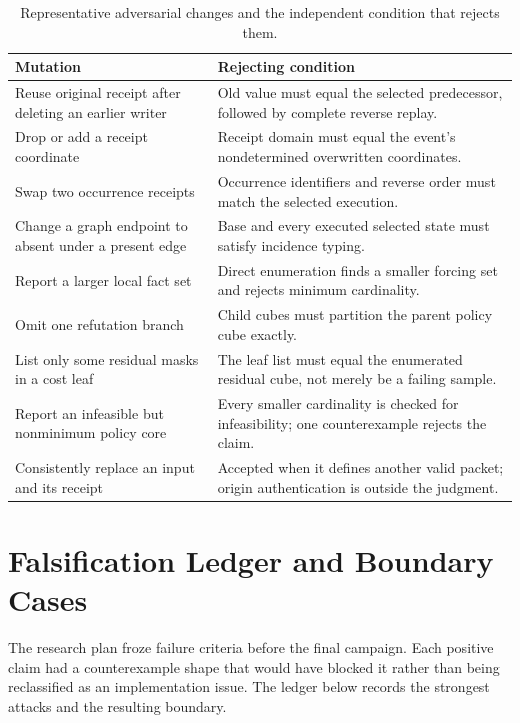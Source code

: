 \begin{table}[t]
\caption{Representative adversarial changes and the independent condition that rejects them.}
\label{tab:mutations}
\small
\begin{tabularx}{\textwidth}{@{}p{}X@{}}
\toprule
Mutation & Rejecting condition \\
\midrule
Reuse original receipt after deleting an earlier writer & Old value must equal the selected predecessor, followed by complete reverse replay. \\
Drop or add a receipt coordinate & Receipt domain must equal the event's nondetermined overwritten coordinates. \\
Swap two occurrence receipts & Occurrence identifiers and reverse order must match the selected execution. \\
Change a graph endpoint to absent under a present edge & Base and every executed selected state must satisfy incidence typing. \\
Report a larger local fact set & Direct enumeration finds a smaller forcing set and rejects minimum cardinality. \\
Omit one refutation branch & Child cubes must partition the parent policy cube exactly. \\
List only some residual masks in a cost leaf & The leaf list must equal the enumerated residual cube, not merely be a failing sample. \\
Report an infeasible but nonminimum policy core & Every smaller cardinality is checked for infeasibility; one counterexample rejects the claim. \\
Consistently replace an input and its receipt & Accepted when it defines another valid packet; origin authentication is outside the judgment. \\
\bottomrule
\end{tabularx}
\end{table}

\section{Falsification Ledger and Boundary Cases}
\label{app:falsification}

The research plan froze failure criteria before the final campaign.  Each positive
claim had a counterexample shape that would have blocked it rather than being
reclassified as an implementation issue.  The ledger below records the strongest
attacks and the resulting boundary.


